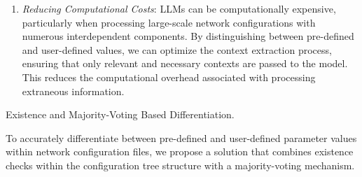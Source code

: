\begin{enumerate}
    \item \textit{Reducing Computational Costs}: LLMs can be computationally expensive, particularly when processing large-scale network configurations with numerous interdependent components. By distinguishing between pre-defined and user-defined values, we can optimize the context extraction process, ensuring that only relevant and necessary contexts are passed to the model. This reduces the computational overhead associated with processing extraneous information.

\end{enumerate}

 Existence and Majority-Voting Based Differentiation.

To accurately differentiate between pre-defined and user-defined parameter values within network configuration files, we propose a solution that combines existence checks within the configuration tree structure with a majority-voting mechanism.

